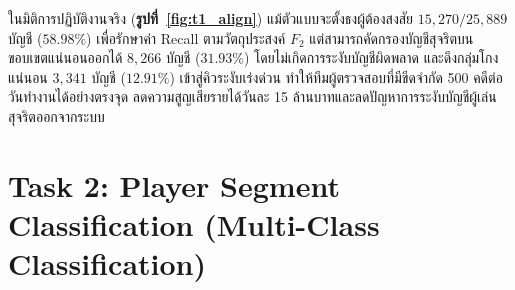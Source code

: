 \documentclass[11pt,a4paper]{article}
\begin{document}
ในมิติการปฏิบัติงานจริง (\textbf{รูปที่~\ref{fig:t1_align}}) แม้ตัวแบบจะตั้งธงผู้ต้องสงสัย $15{,}270 / 25{,}889$ บัญชี ($58.98\%$) เพื่อรักษาค่า Recall ตามวัตถุประสงค์ $F_2$ แต่สามารถคัดกรองบัญชีสุจริตบนขอบเขตแน่นอนออกได้ $8{,}266$ บัญชี ($31.93\%$) โดยไม่เกิดการระงับบัญชีผิดพลาด และดึงกลุ่มโกงแน่นอน $3{,}341$ บัญชี ($12.91\%$) เข้าสู่คิวระงับเร่งด่วน ทำให้ทีมผู้ตรวจสอบที่มีขีดจำกัด 500 คดีต่อวันทำงานได้อย่างตรงจุด ลดความสูญเสียรายได้วันละ 15 ล้านบาทและลดปัญหาการระงับบัญชีผู้เล่นสุจริตออกจากระบบ

\clearpage
\section{Task 2: Player Segment Classification (Multi-Class Classification)}
\end{document}
